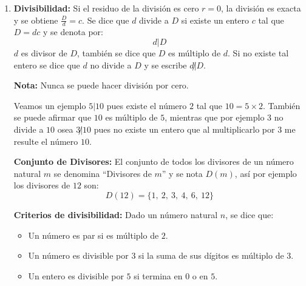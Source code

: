 \begin{enumerate}
    La división también la podemos representar como en (\ref{eq:divisionum}) así\footnote{En algunas ocasiones $2+\frac{3}{4}$ se escribe $2\frac{3}{4}$ y se lee ``dos enteros tres cuartos''.}:
    \begin{equation}\label{eq:divisionum}
         \frac{11}{4}=2+\frac{3}{4}
    \end{equation}

    En términos generales el algoritmo de Euclides se puede escribir como en (\ref{eq:euclides1}) y se leerá, dividendo ``D'' sobre divisor ``d'' es igual al cociente ``c'' más el residuo ``r'' sobre el divisor.
    \begin{equation}\label{eq:euclides1}
         \frac{D}{d}=c+\frac{r}{d}
    \end{equation}
     
    Al reescribir la ecuación (\ref{eq:euclides1}) se obtiene (\ref{eq:euclides}):
    \begin{equation}\label{eq:euclides}
        D=cd+r
    \end{equation}
    Así para el ejercicio que se había analizado de los $11$ objetos dividido entre $4$ personas, se puede escribir:
    \[ 11=2\times 4+3 \]

    \item \textbf{Divisibilidad:}
    Si el residuo de la división es cero $r=0$, la división es exacta y se obtiene $\frac{D}{d}=c$.
    Se dice que $d$ divide a $D$ si existe un entero $c$ tal que $D=dc$ y se denota por:
    \[ d|D \]
    $d$ es divisor de $D$, también se dice que $D$ es múltiplo de $d$. Si no existe tal entero se dice que $d$ no divide a $D$ y se escribe $d\not | D$.
    
    \textbf{Nota:} Nunca se puede hacer división por cero.

    Veamos un ejemplo $5|10$ pues existe el número $2$ tal que $10= 5\times 2$. También se puede afirmar que $10$ es múltiplo de $5$, mientras que por ejemplo $3$ no divide a $10$ osea $3\not| 10$ pues no existe un entero que al multiplicarlo por $3$ me resulte el número $10$.  

    \textbf{Conjunto de Divisores:} El conjunto de todos los divisores de un número natural $m$ se denomina ``Divisores de $m$'' y se nota $D(m)$, así por ejemplo los divisores de $12$ son:
    \[ D(12)=\{ 1,\ 2,\ 3,\ 4,\ 6,\ 12\} \]

    \textbf{Criterios de divisibilidad:} Dado un número natural $n$, se dice que:
    \begin{itemize}
        \item Un número es par si es múltiplo de $2$.
        \item Un número es divisible por $3$ si la suma de sus dígitos es múltiplo de $3$.
        \item Un entero es divisible por $5$ si termina en $0$ o en $5$.
    \end{itemize}


\end{enumerate}
